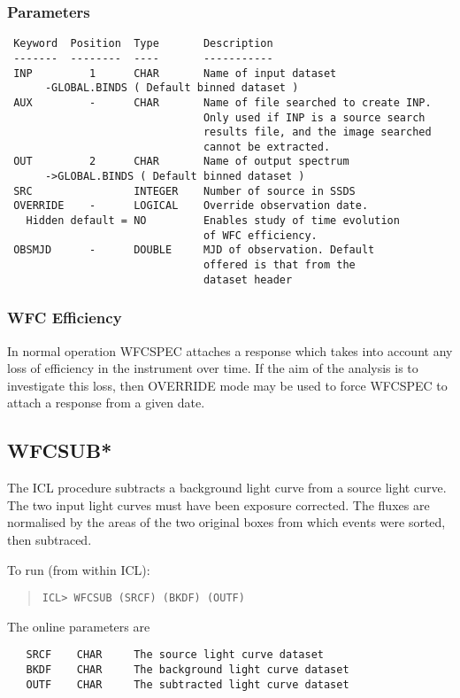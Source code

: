 \documentclass{book}
\renewcommand{\_}{{\tt\char'137}}     %
\begin{document}
\subsubsection{Parameters}
\begin{verbatim}
 Keyword  Position  Type       Description
 -------  --------  ----       -----------
 INP         1      CHAR       Name of input dataset
      -GLOBAL.BINDS ( Default binned dataset )
 AUX         -      CHAR       Name of file searched to create INP.
                               Only used if INP is a source search
                               results file, and the image searched
                               cannot be extracted.
 OUT         2      CHAR       Name of output spectrum
      ->GLOBAL.BINDS ( Default binned dataset )
 SRC                INTEGER    Number of source in SSDS
 OVERRIDE    -      LOGICAL    Override observation date.
   Hidden default = NO         Enables study of time evolution
                               of WFC efficiency.
 OBSMJD      -      DOUBLE     MJD of observation. Default
                               offered is that from the
                               dataset header
\end{verbatim}\subsubsection{WFC Efficiency}
In normal operation WFCSPEC attaches a response which takes into
account any loss of efficiency in the instrument over time. If
the aim of the analysis is to investigate this loss, then OVERRIDE
mode may be used to force WFCSPEC to attach a response from a
given date.
 
\subsection{WFCSUB*}
The ICL procedure subtracts a background light curve from a source light
curve. The two input light curves must have been exposure corrected. The
fluxes are normalised by the areas of the two original boxes from which
events were sorted, then subtraced.
 
To run (from within ICL):
\begin{quote}\begin{verbatim}
ICL> WFCSUB (SRCF) (BKDF) (OUTF)
\end{verbatim}\end{quote}
The online parameters are
\begin{verbatim}
   SRCF    CHAR     The source light curve dataset
   BKDF    CHAR     The background light curve dataset
   OUTF    CHAR     The subtracted light curve dataset
\end{verbatim}
\end{document}
